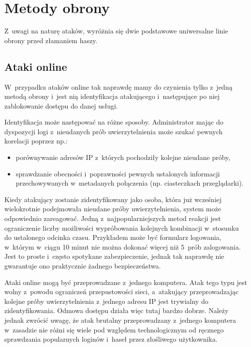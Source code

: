 \section{Metody obrony}

Z~uwagi na naturę ataków, wyróżnia się dwie podstawowe uniwersalne linie obrony
przed złamaniem haszy.

\subsection{Ataki online}

W~przypadku ataków online tak naprawdę mamy do czynienia tylko z~jedną metodą
obrony i~jest nią identyfikacja atakującego i~następujące po niej zablokowanie
dostępu do danej usługi.

Identyfikacja może następować na różne sposoby. Administrator mając do
dyspozycji logi z~nieudanych prób uwierzytelnienia może szukać pewnych
korelacji poprzez np.:

\begin{itemize}

\item porównywanie adresów IP z~których pochodziły kolejne nieudane próby,

\item sprawdzanie obecności i~poprawności pewnych ustalonych informacji
przechowywanych w~metadanych połączenia (np. ciasteczkach przeglądarki).

\end{itemize}

Kiedy atakujący zostanie zidentyfikowany jako osoba, która już wcześniej
wielokrotnie podejmowała nieudane próby uwierzytelnienia, system może
odpowiednio zareagować. Jedną z~najpopularniejszych metod reakcji jest
ograniczenie liczby możliwości wypróbowania kolejnych kombinacji w~stosunku do
ustalonego odcinka czasu. Przykładem może być formularz logowania, w~którym
w~ciągu 10 minut nie można dokonać więcej niż 5~prób zalogowania. Jest to
proste i~często spotykane zabezpieczenie, jednak tak naprawdę nie gwarantuje
ono praktycznie żadnego bezpieczeństwa.

Ataki online mogą być przeprowadzane z~jednego komputera. Atak tego typu jest
wolny z~powodu ograniczeń przepustowości sieci, a~atakujący przeprowadzając
kolejne próby uwierzytelnienia z~jednego adresu IP jest trywialny do
zidentyfikowania. Odmowa dostępu działa więc tutaj bardzo dobrze. Należy jednak
zwrócić uwagę, że atak brutalny przeprowadzany z~jednego komputera w~zasadzie
nie różni się wiele pod względem technologicznym od ręcznego sprawdzania
popularnych loginów i~haseł przez złośliwego użytkownika.

